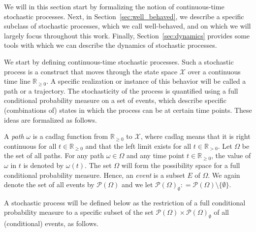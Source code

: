 \documentclass[10pt]{paper}
\theoremstyle{definition}
\newcommand{\reals}{\mathbb{R}}
\newcommand{\realspos}{\reals_{>0}}
\newcommand{\realsnonneg}{\reals_{\geq 0}}
\newcommand{\states}{\mathcal{X}}
\newcommand{\paths}{\Omega}
\newcommand{\power}{\mathcal{P}(\paths)}
\newcommand{\nonemptypower}{\power_{\emptyset}}
\newcommand{\coloneqq}{:\!=}
\begin{document}
We will in this section start by formalizing the notion of continuous-time stochastic processes. Next, in Section~\ref{sec:well_behaved}, we describe a specific subclass of stochastic processes, which we call well-behaved, and on which we will largely focus throughout this work. Finally, Section~\ref{sec:dynamics} provides some tools with which we can describe the dynamics of stochastic processes.

We start by defining continuous-time stochastic processes. Such a stochastic process is a construct that moves through the state space $\states$ over a continuous time line $\realsnonneg$. A specific realization or instance of this behavior will be called a path or a trajectory. The stochasticity of the process is quantified using a full conditional probability measure on a set of events, which describe specific (combinations of) states in which the process can be at certain time points. These ideas are formalized as follows.

A \emph{path} $\omega$ is a cadlag function from $\realsnonneg$ to $\states$, where cadlag means that it is right continuous for all $t\in\realsnonneg$ and that the left limit exists for all $t\in\realspos$. Let $\paths$ be the set of all paths. For any path $\omega\in\paths$ and any time point $t\in\realsnonneg$, the value of $\omega$ in $t$ is denoted by $\omega(t)$. The set $\Omega$ will form the possibility space for a full conditional probability measure. Hence, an \emph{event} is a subset $E$ of $\paths$. We again denote the set of all events by $\power$ and we let $\nonemptypower\coloneqq\power\setminus\{\emptyset\}$. 

A stochastic process will be defined below as the restriction of a full conditional probability measure to a specific subset of the set $\power\times\nonemptypower$ of all (conditional) events, as follows.
\end{document}
